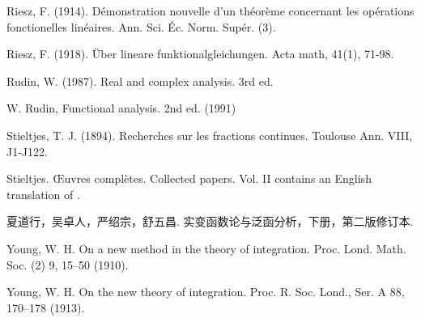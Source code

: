 \documentclass[12pt,b5paper,notitlepage]{article}
\theoremstyle{definition}
\theoremstyle{plain}
\numberwithin{equation}{section}
\begin{document}
\begin{thebibliography}{999999}
Riesz, F. (1914). D{\'e}monstration nouvelle d'un th{\'e}or{\`e}me concernant les op{\'e}rations fonctionelles lin{\'e}aires. Ann. Sci. {\'E}c. Norm. Sup{\'e}r. (3).

Riesz, F. (1918). \"Uber lineare funktionalgleichungen. Acta math, 41(1), 71-98.

Rudin, W. (1987). Real and complex analysis. 3rd ed.

W. Rudin, Functional analysis. 2nd ed. (1991)


Stieltjes, T. J. (1894). Recherches sur les fractions continues. Toulouse Ann. VIII, J1-J122.

Stieltjes. {\OE}uvres compl{\`e}tes. {Collected} papers. Vol. II contains an English translation of \cite{Sti94}.


\begin{CJK*}{UTF8}{gkai}
夏道行，吴卓人，严绍宗，舒五昌. 实变函数论与泛函分析，下册，第二版修订本.
\end{CJK*}


Young, W. H. On a new method in the theory of integration. Proc. Lond. Math. Soc. (2) 9, 15--50 (1910).

Young, W. H. On the new theory of integration.  Proc. R. Soc. Lond., Ser. A 88, 170--178 (1913).


		
\end{thebibliography}


\end{document}
